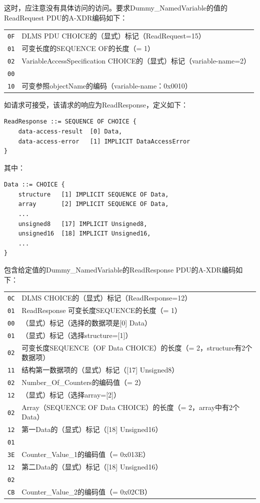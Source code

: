 \documentclass[a4paper,11pt]{ctexart}
\begin{document}
\noindent 这时，应注意没有具体访问的访问。要求Dummy\_NamedVariable的值的ReadRequest PDU的A-XDR编码如下：

\begin{center}
\begin{tabular}{ll}
\texttt{0F} & DLMS PDU CHOICE的（显式）标记（ReadRequest=15）\\
\texttt{01} & 可变长度的SEQUENCE OF的长度（= 1）\\
\texttt{02} & VariableAccessSpecification CHOICE的（显式）标记（variable-name=2）\\
\texttt{00} & \\
\texttt{10} & 可变参照objectName的编码（variable-name：0x0010）\\
\end{tabular}
\end{center}

如请求可接受，该请求的响应为ReadResponse，定义如下：
\begin{verbatim}
ReadResponse ::= SEQUENCE OF CHOICE {
    data-access-result  [0] Data,
    data-access-error   [1] IMPLICIT DataAccessError
}
\end{verbatim}

\noindent 其中：
\begin{verbatim}
Data ::= CHOICE {
    structure   [1] IMPLICIT SEQUENCE OF Data,
    array       [2] IMPLICIT SEQUENCE OF Data,
    ...
    unsigned8   [17] IMPLICIT Unsigned8,
    unsigned16  [18] IMPLICIT Unsigned16,
    ...
}
\end{verbatim}

\noindent 包含给定值的Dummy\_NamedVariable的ReadResponse PDU的A-XDR编码如下：

\begin{center}
\begin{tabular}{ll}
\texttt{0C} & DLMS CHOICE的（显式）标记（ReadResponse=12）\\
\texttt{01} & ReadResponse 可变长度SEQUENCE的长度（= 1）\\
\texttt{00} & （显式）标记（选择的数据项是[0] Data）\\
\texttt{01} & （显式）标记（选择structure=[1]）\\
\texttt{02} & 可变长度SEQUENCE（OF Data CHOICE）的长度（= 2，structure有2个数据项）\\
\texttt{11} & 结构第一数据项的（显式）标记（[17] Unsigned8）\\
\texttt{02} & Number\_Of\_Counters的编码值（= 2）\\
\texttt{12} & （显式）标记（选择array=[2]）\\
\texttt{02} & Array（SEQUENCE OF Data CHOICE）的长度（= 2，array中有2个Data）\\
\texttt{12} & 第一Data的（显式）标记（[18] Unsigned16）\\
\texttt{01} & \\
\texttt{3E} & Counter\_Value\_1的编码值（= 0x013E）\\
\texttt{12} & 第二Data的（显式）标记（[18] Unsigned16）\\
\texttt{02} & \\
\texttt{CB} & Counter\_Value\_2的编码值（= 0x02CB）\\
\end{tabular}
\end{center}
\end{document}
